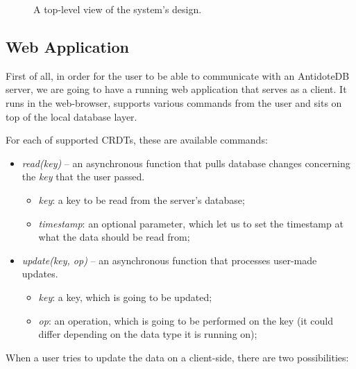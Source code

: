 \begin{figure}[!htb]
    \begin{center}
        \setlength{\fboxsep}{15pt}%
        \setlength{\fboxrule}{1pt}%
    \def\svgwidth{\linewidth}
    \fbox{}
    \caption {A top-level view of the system's design.}
    \label{fig:design5}
\end{center}
\end{figure}

\subsection{Web Application}

First of all, in order for the user to be able to communicate with an AntidoteDB server, we are going to have a running web application that serves as a client. It runs in the web-browser, supports various commands from the user and sits on top of the local database layer. 

\vspace{5mm}For each of supported CRDTs, these are available commands:

\begin{itemize}
    \item \textit{read(key)} -- an asynchronous function that pulls database changes concerning the \textit{key} that the user passed.
         \begin{itemize}
         \item \textit{key}: a key to be read from the server's database;
         \item \textit{timestamp}: an optional parameter, which let us to set the timestamp at what the data should be read from;
     \end{itemize}
    \item \textit{update(key, op)}  -- an asynchronous function that processes user-made updates.
     \begin{itemize}
         \item \textit{key}: a key, which is going to be updated;
         \item \textit{op}: an operation, which is going to be performed on the key (it could differ depending on the data type it is running on);
     \end{itemize}
  \end{itemize}
  
 When a user tries to update the data on a client-side, there are two possibilities:
  
